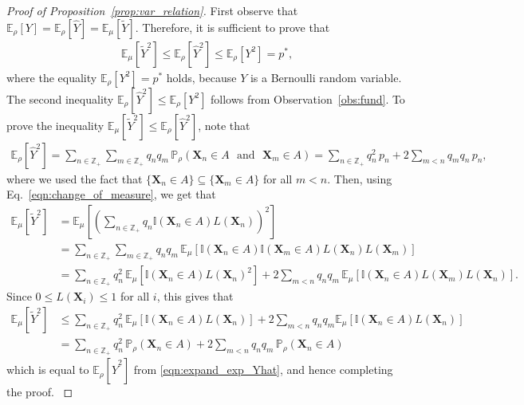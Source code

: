 \documentclass[pdflatex, sn-mathphys-ay]{sn-jnl}%
\newcommand{\intg}{\mathbb{Z}}
\newcommand{\ind}{\mathbb{I}}
\renewcommand{\v}[1]{\boldsymbol{#1}}
\newcommand{\pp}{\mathbb{P}}
\newcommand{\ee}{\mathbb{E}}
\newcommand{\mX}{\v{X}}
\newcommand{\lt}{\left}
\newcommand{\rt}{\right}
\newcommand{\wt}{\widetilde}
\newcommand{\wh}{\widehat}
\theoremstyle{thmstyleone}%
\theoremstyle{thmstyletwo}%
\theoremstyle{thmstylethree}%
\begin{document}
\begin{proof}[Proof of Proposition~\ref{prop:var_relation}]
First observe that $
\ee_\rho[Y] = \ee_\rho[\wh Y] = \ee_\mu[\wt Y]$.
Therefore, it is sufficient to prove that 
\begin{align}
\label{eqn:2nd-mt-rel}
\ee_\mu[\wt Y^2] \leq \ee_\rho[\wh Y^2] \leq \ee_\rho[Y^2] = p^*,
\end{align}
where the equality $\ee_\rho[Y^2] = p^*$ holds, because $Y$ is a Bernoulli random variable.
The second inequality $\ee_\rho[\wh Y^2] \leq \ee_\rho[Y^2]$ follows from Observation~\ref{obs:fund}.
To prove the inequality $\ee_\mu[\wt Y^2] \leq \ee_\rho[\wh Y^2]$, note that 
\begin{align}
\ee_\rho[\wh Y^2] = \sum_{n \in \intg_+} \sum_{m \in \intg_+} q_n q_m\, \pp_\rho(\mX_n \in A\,\, \text{ and }\,\, \mX_m \in A)
             = \sum_{n \in \intg_+} q_n^2\, p_n  + 2 \sum_{ m < n } q_m q_n\, p_n,
             \label{eqn:expand_exp_Yhat}
\end{align}
where we used the fact that $\{\mX_n \in A\} \subseteq  \{\mX_m \in A\}$ for all $m < n$. Then, using Eq.~\eqref{eqn:change_of_measure}, we get that
\begin{align}
\ee_\mu[\wt Y^2] &= \ee_\mu\lt[ \lt(\sum_{n \in \intg_+} q_n \ind(\mX_n \in A) L(\mX_n) \rt)^2\rt]\nonumber\\
                          &= \sum_{n \in \intg_+} \sum_{m \in \intg_+}  q_n q_m \, \ee_\mu\lt[\ind(\mX_n \in A) \ind( \mX_m \in A) L(\mX_n) L(\mX_m)\rt]\nonumber\\                         
                          &= \sum_{n \in \intg_+} q_n^2\, \ee_\mu\lt[\ind(\mX_n \in A) L(\mX_n)^2 \rt] + 2 \sum_{ m < n } q_n q_m \, \ee_\mu\lt[\ind(\mX_n \in A) L(\mX_m) L(\mX_n)\rt].\label{eqn:tilde_Y_expand}
\end{align}
Since $0 \leq L(\mX_i) \leq 1$ for all $i$, this gives that 
\begin{align}                         
      \ee_\mu[\wt Y^2]    &\leq \sum_{n \in \intg_+} q_n^2\, \ee_\mu\lt[\ind(\mX_n \in A) L(\mX_n) \rt] + 2 \sum_{ m < n } q_nq_m \ee_\mu\lt[\ind(\mX_n \in A) L(\mX_n)\rt]\nonumber\\
                          &= \sum_{n \in \intg_+} q_n^2\,\pp_\rho(\mX_n \in A)  + 2 \sum_{ m < n } q_n q_m\,\pp_\rho(\mX_n \in A)\label{eqn:hat_Y_expand}
\end{align}
{  which is equal to $\ee_\rho[\wh Y^2 ]$ from \eqref{eqn:expand_exp_Yhat}, and hence completing the proof. }
\end{proof}
\end{document}
